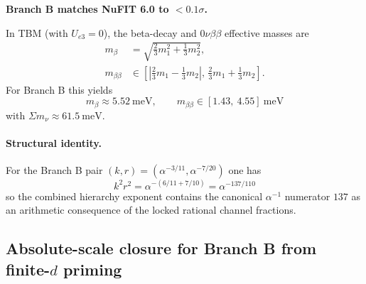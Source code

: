\begin{table}[h]
\centering
\caption{Neutrino mass branch predictions.}\label{tab:neutrino-branches}
\end{table}

\textbf{Branch B matches NuFIT 6.0 to $< 0.1\sigma$.}

In TBM (with $U_{e3}=0$), the beta-decay and $0\nu\beta\beta$ effective masses are
\begin{align}
m_\beta &= \sqrt{\tfrac{2}{3}m_1^2+\tfrac{1}{3}m_2^2}, \\
m_{\beta\beta} &\in \left[\left|\tfrac{2}{3}m_1-\tfrac{1}{3}m_2\right|,\, \tfrac{2}{3}m_1+\tfrac{1}{3}m_2\right].
\end{align}
For Branch B this yields
\begin{equation}
\boxed{\;m_\beta \approx 5.52\ \mathrm{meV},\qquad
m_{\beta\beta} \in [1.43,\ 4.55]\ \mathrm{meV}\;}
\end{equation}
with $\Sigma m_\nu \approx 61.5\ \mathrm{meV}$.

\paragraph{Structural identity.}
For the Branch B pair $(k,r)=(\alpha^{-3/11},\alpha^{-7/20})$ one has
\begin{equation}
\boxed{k^2 r^2 = \alpha^{-(6/11+7/10)}=\alpha^{-137/110}}
\end{equation}
so the combined hierarchy exponent contains the canonical $\alpha^{-1}$ numerator $137$
as an arithmetic consequence of the locked rational channel fractions.

\subsection{Absolute-scale closure for Branch B from finite-$d$ priming}\label{app:nu-abs-scale}

